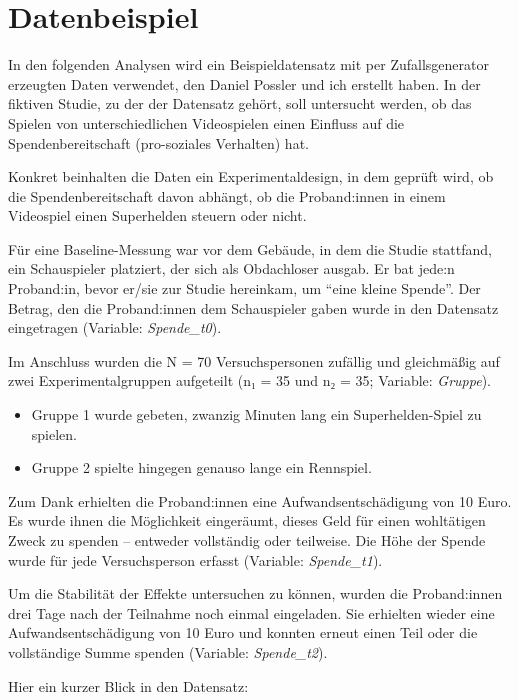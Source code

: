 \documentclass[
]{book}
\begin{document}
\hypertarget{datenbeispiel}{%
\section{Datenbeispiel}\label{datenbeispiel}}

In den folgenden Analysen wird ein Beispieldatensatz mit per Zufallsgenerator erzeugten Daten verwendet, den Daniel Possler und ich erstellt haben.
In der fiktiven Studie, zu der der Datensatz gehört, soll untersucht werden, ob das Spielen von unterschiedlichen Videospielen einen Einfluss auf die Spendenbereitschaft (pro-soziales Verhalten) hat.

Konkret beinhalten die Daten ein Experimentaldesign, in dem geprüft wird, ob die Spendenbereitschaft davon abhängt, ob die Proband:innen in einem Videospiel einen Superhelden steuern oder nicht.

Für eine Baseline-Messung war vor dem Gebäude, in dem die Studie stattfand, ein Schauspieler platziert, der sich als Obdachloser ausgab.
Er bat jede:n Proband:in, bevor er/sie zur Studie hereinkam, um ``eine kleine Spende''.
Der Betrag, den die Proband:innen dem Schauspieler gaben wurde in den Datensatz eingetragen (Variable: \emph{Spende\_t0}).

Im Anschluss wurden die N = 70 Versuchspersonen zufällig und gleichmäßig auf zwei Experimentalgruppen aufgeteilt (n₁ = 35 und n₂ = 35; Variable: \emph{Gruppe}).

\begin{itemize}
\item
  Gruppe 1 wurde gebeten, zwanzig Minuten lang ein Superhelden-Spiel zu spielen.
\item
  Gruppe 2 spielte hingegen genauso lange ein Rennspiel.
\end{itemize}

Zum Dank erhielten die Proband:innen eine Aufwandsentschädigung von 10 Euro. Es wurde ihnen die Möglichkeit eingeräumt, dieses Geld für einen wohltätigen Zweck zu spenden -- entweder vollständig oder teilweise.
Die Höhe der Spende wurde für jede Versuchsperson erfasst (Variable: \emph{Spende\_t1}).

Um die Stabilität der Effekte untersuchen zu können, wurden die Proband:innen drei Tage nach der Teilnahme noch einmal eingeladen.
Sie erhielten wieder eine Aufwandsentschädigung von 10 Euro und konnten erneut einen Teil oder die vollständige Summe spenden (Variable: \emph{Spende\_t2}).

Hier ein kurzer Blick in den Datensatz:
\end{document}
